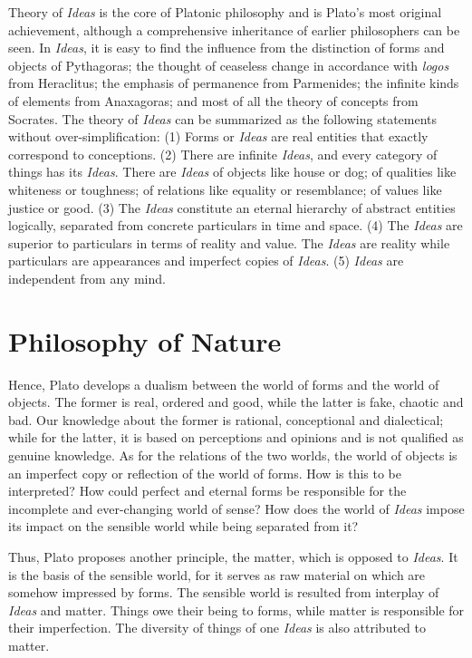 \documentclass[11pt]{article}
\begin{document}
Theory of \textit{Ideas} is the core of Platonic philosophy and is Plato’s most original achievement, although a comprehensive inheritance of earlier philosophers can be seen. 
In \textit{Ideas}, it is easy to find the influence from the distinction of forms and objects of Pythagoras; 
the thought of ceaseless change in accordance with \textit{logos} from Heraclitus; 
the emphasis of permanence from Parmenides; 
the infinite kinds of elements from Anaxagoras; 
and most of all the theory of concepts from Socrates. 
The theory of \textit{Ideas} can be summarized as the following statements without over-simplification: 
(1) Forms or \textit{Ideas} are real entities that exactly correspond to conceptions. 
(2) There are infinite \textit{Ideas}, and every category of things has its \textit{Ideas}. 
There are \textit{Ideas} of objects like house or dog; 
of qualities like whiteness or toughness; 
of relations like equality or resemblance; 
of values like justice or good. 
(3) The \textit{Ideas} constitute an eternal hierarchy of abstract entities logically, separated from concrete particulars in time and space. 
(4) The \textit{Ideas} are superior to particulars in terms of reality and value. 
The \textit{Ideas} are reality while particulars are appearances and imperfect copies of \textit{Ideas}. 
(5) \textit{Ideas} are independent from any mind.
  
\section{Philosophy of Nature}
Hence, Plato develops a dualism between the world of forms and the world of objects. 
The former is real, ordered and good, while the latter is fake, chaotic and bad. 
Our knowledge about the former is rational, conceptional and dialectical; 
while for the latter, it is based on perceptions and opinions and is not qualified as genuine knowledge. 
As for the relations of the two worlds, the world of objects is an imperfect copy or reflection of the world of forms. 
How is this to be interpreted? 
How could perfect and eternal forms be responsible for the incomplete and ever-changing world of sense? 
How does the world of \textit{Ideas} impose its impact on the sensible world while being separated from it?

\newline

Thus, Plato proposes another principle, the matter, which is opposed to \textit{Ideas}. 
It is the basis of the sensible world, for it serves as raw material on which are somehow impressed by forms. 
The sensible world is resulted from interplay of \textit{Ideas} and matter. 
Things owe their being to forms, while matter is responsible for their imperfection. 
The diversity of things of one \textit{Ideas} is also attributed to matter. 
\end{document}
